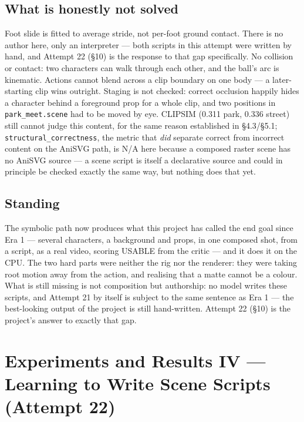 \documentclass[11pt]{article}
\newcommand{\secsym}{\S}
\begin{document}
\subsection{What is honestly not solved}
\label{sec:a21notsolved}

Foot slide is fitted to average stride, not per-foot ground contact.
There is no author here, only an interpreter --- both scripts in this
attempt were written by hand, and Attempt 22 (\secsym10) is the response
to that gap specifically. No collision or contact: two characters can
walk through each other, and the ball's arc is kinematic. Actions cannot
blend across a clip boundary on one body --- a later-starting clip wins
outright. Staging is not checked: correct occlusion happily hides a
character behind a foreground prop for a whole clip, and two positions in
\texttt{park\_meet.scene} had to be moved by eye. CLIPSIM (0.311 park,
0.336 street) still cannot judge this content, for the same reason
established in \secsym4.3/\secsym5.1; \texttt{structural\_correctness},
the metric that \emph{did} separate correct from incorrect content on the
AniSVG path, is N/A here because a composed raster scene has no AniSVG
source --- a scene script is itself a declarative source and could in
principle be checked exactly the same way, but nothing does that yet.

\subsection{Standing}
\label{sec:a21standing}

The symbolic path now produces what this project has called the end goal
since Era 1 --- several characters, a background and props, in one
composed shot, from a script, as a real video, scoring USABLE from the
critic --- and it does it on the CPU. The two hard parts were neither the
rig nor the renderer: they were taking root motion away from the action,
and realising that a matte cannot be a colour. What is still missing is
not composition but authorship: no model writes these scripts, and
Attempt 21 by itself is subject to the same sentence as Era 1 --- the
best-looking output of the project is still hand-written. Attempt 22
(\secsym10) is the project's answer to exactly that gap.

\section{Experiments and Results IV --- Learning to Write Scene Scripts (Attempt 22)}
\label{sec:results4}
\end{document}
